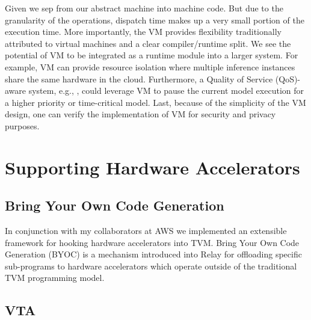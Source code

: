 Given we sep from our abstract machine into machine code.
But due to the granularity of the operations, dispatch time makes
  up a very small portion of the execution time.
More importantly, the VM provides flexibility traditionally attributed
  to virtual machines and a clear compiler/runtime split.
We see the potential of VM to be integrated as a runtime module into a larger system.
For example, VM can provide resource isolation where multiple inference
  instances share the same hardware in the cloud.
Furthermore, a Quality of Service (QoS)-aware system, e.g., \citep{kang2018hotmobile, Yachir2009rsj},
  could leverage VM to pause the current model execution for a higher priority or time-critical model.
Last, because of the simplicity of the VM design, one can verify the implementation of VM for security and privacy purposes.


\section{Supporting Hardware Accelerators}
\label{sec:accel}

\subsection{Bring Your Own Code Generation}

In conjunction with my collaborators at AWS we implemented an
  extensible framework for hooking hardware accelerators into
  TVM.
Bring Your Own Code Generation (BYOC) is a mechanism introduced
  into Relay for offloading specific sub-programs to hardware
  accelerators which operate outside of the traditional TVM
  programming model.


\subsection{VTA}

